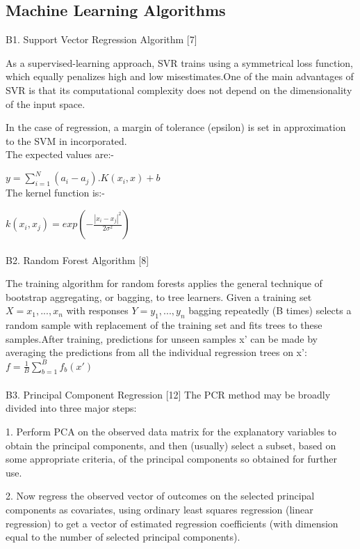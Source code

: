 \documentclass[a4paper, 14 pt, conference]{ieeeconf}
\begin{document}
\subsection{Machine Learning Algorithms}

B1. Support Vector Regression Algorithm [7]

As a supervised-learning approach, SVR trains using a symmetrical loss function, which equally penalizes high and low misestimates.One of the main advantages of SVR is that its computational complexity does not depend on the dimensionality of the input space.

 In the case of regression, a margin of tolerance (epsilon) is set in approximation to the SVM in incorporated.
 \\
 The expected values are:- 
 
 $y= \sum_{i=1}^{N}(a_{i}-a_{j}).K(x_{i},x)+b$
 \\
 The kernel function is:-
 
 $k(x_{i},x_{j})=exp(-\frac{|x_{i}-x_{j}|^{2}}{2\sigma^{2}})$
\\
\\
B2.  Random Forest Algorithm [8]

The training algorithm for random forests applies the general technique of bootstrap aggregating, or bagging, to tree learners. Given a training set $X = x_{1}, ..., x_{n}$ with responses $Y = y_{1}, ..., y_{n}$ bagging repeatedly (B times) selects a random sample with replacement of the training set and fits trees to these samples.After training, predictions for unseen samples x' can be made by averaging the predictions from all the individual regression trees on x':
\\
  $  f = \frac{1}{B}\sum_{b=1}^{B}f_{b}(x')$
\\
\\
B3. Principal Component Regression [12]
The PCR method may be broadly divided into three major steps:

    1. Perform PCA on the observed data matrix for the explanatory variables to obtain the principal components, and then (usually) select a subset, based on some appropriate criteria, of the principal components so obtained for further use.

    2.  Now regress the observed vector of outcomes on the selected principal components as covariates, using ordinary least squares regression (linear regression) to get a vector of estimated regression coefficients (with dimension equal to the number of selected principal components).
\end{document}
